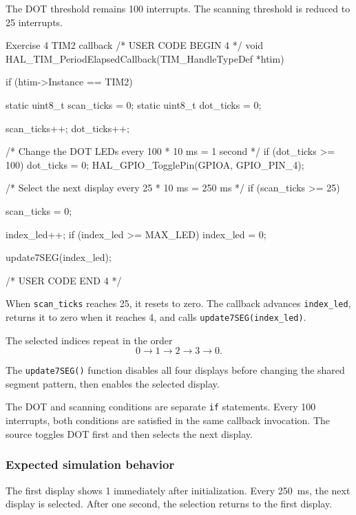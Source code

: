 \documentclass[a4paper]{article}
\begin{document}
The DOT threshold remains 100 interrupts.
The scanning threshold is reduced to 25 interrupts.

\begin{stmcode}{Exercise 4 TIM2 callback}
/* USER CODE BEGIN 4 */
void HAL_TIM_PeriodElapsedCallback(TIM_HandleTypeDef *htim)
{
    if (htim->Instance == TIM2)
    {
        static uint8_t scan_ticks = 0;
        static uint8_t dot_ticks = 0;

        scan_ticks++;
        dot_ticks++;

        /* Change the DOT LEDs every 100 * 10 ms = 1 second */
        if (dot_ticks >= 100)
        {
            dot_ticks = 0;
            HAL_GPIO_TogglePin(GPIOA, GPIO_PIN_4);
        }

        /* Select the next display every 25 * 10 ms = 250 ms */
        if (scan_ticks >= 25)
        {
            scan_ticks = 0;

            index_led++;
            if (index_led >= MAX_LED)
            {
                index_led = 0;
            }

            update7SEG(index_led);
        }
    }
}
/* USER CODE END 4 */
\end{stmcode}

When \texttt{scan\_ticks} reaches 25, it resets
to zero. The callback advances \texttt{index\_led},
returns it to zero when it reaches 4, and calls
\texttt{update7SEG(index\_led)}.

The selected indices repeat in the order
\[
    0 \rightarrow 1 \rightarrow 2 \rightarrow 3
    \rightarrow 0.
\]

The \texttt{update7SEG()} function disables all
four displays before changing the shared segment
pattern, then enables the selected display.

The DOT and scanning conditions are separate
\texttt{if} statements. Every 100 interrupts,
both conditions are satisfied in the same callback
invocation. The source toggles DOT first and
then selects the next display.

\subsubsection{Expected simulation behavior}

The first display shows 1 immediately after
initialization. Every 250~ms, the next display
is selected. After one second, the selection
returns to the first display.
\end{document}
